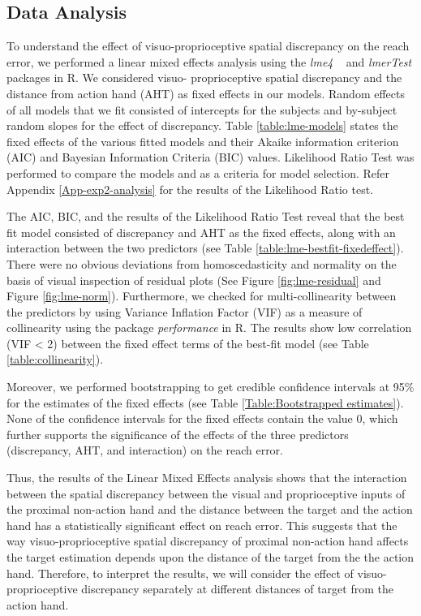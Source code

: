 \subsection{Data Analysis}




To understand the effect of visuo-proprioceptive spatial discrepancy on the reach error, we performed a linear mixed effects analysis using the \emph{lme4} ~\cite{bates2014fitting} and \emph{lmerTest} packages in R. We considered visuo- proprioceptive spatial discrepancy and the distance from action hand (AHT) as fixed effects in our models. Random effects of all models that we fit consisted of intercepts for the subjects and by-subject random slopes for the effect of discrepancy. Table \ref{table:lme-models} states the fixed effects of the various fitted models and their Akaike information criterion (AIC) and Bayesian Information Criteria (BIC) values. Likelihood Ratio Test was performed to compare the models and as a criteria for model selection. Refer Appendix \ref{App-exp2-analysis} for the results of the Likelihood Ratio test. 

The AIC, BIC, and the results of the Likelihood Ratio Test reveal that the best fit model consisted of discrepancy and AHT as the fixed effects, along with an interaction between the two predictors (see Table \ref{table:lme-bestfit-fixedeffect}). There were no obvious deviations from homoscedasticity and normality on the basis of visual inspection of residual plots (See Figure \ref{fig:lme-residual} and Figure \ref{fig:lme-norm}). Furthermore, we checked for multi-collinearity between the predictors by using Variance Inflation Factor (VIF) as a measure of collinearity using the package \emph{performance} in R. The results show low correlation (VIF < 2) between the fixed effect terms of the best-fit model (see Table \ref{table:collinearity}).

Moreover, we performed bootstrapping to get credible confidence intervals at 95\% for the estimates of the fixed effects (see Table \ref{Table:Bootstrapped estimates}). None of the confidence intervals for the fixed effects contain the value 0, which further supports the significance of the effects of the three predictors (discrepancy, AHT, and interaction) on the reach error. 

Thus, the results of the Linear Mixed Effects analysis shows that the interaction between the spatial discrepancy between the visual and proprioceptive inputs of the proximal non-action hand and the distance between the target and the action hand has a statistically significant effect on reach error. This suggests that the way visuo-proprioceptive spatial discrepancy of proximal non-action hand affects the target estimation depends upon the distance of the target from the the action hand. Therefore, to interpret the results, we will consider the effect of visuo-proprioceptive discrepancy separately at different distances of target from the action hand. 



